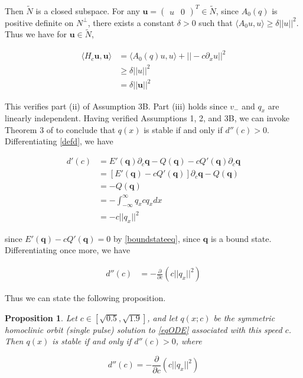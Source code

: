 \documentclass[12pt]{article}
\newtheorem{proposition}{Proposition}
\begin{document}
Then $\tilde{N}$ is a closed subspace. For any $\textbf{u} = \begin{pmatrix}u & 0\end{pmatrix}^T \in \tilde{N}$, since $A_0(q)$ is positive definite on $N^\perp$, there exists a constant $\delta > 0$ such that $\langle A_0 u, u \rangle \geq \delta ||u||^2$. Thus we have for $\textbf{u} \in \tilde{N}$,

\begin{align*}
\langle H_c \textbf{u}, \textbf{u} \rangle 
&= \langle A_0(q) u, u \rangle + || -c \partial_x u||^2 \\
&\geq \delta ||u||^2\\
&= \delta ||\textbf{u}||^2
\end{align*}

This verifies part (ii) of Assumption 3B. Part (iii) holds since $v_-$ and $q_x$ are linearly independent. Having verified Assumptions 1, 2, and 3B, we can invoke Theorem 3 of \cite{Grillakis1987} to conclude that $q(x)$ is stable if and only if $d''(c) > 0$. Differentiating \eqref{defd}, we have

\begin{align*}
d'(c) &= E'(\textbf{q})\partial_c \textbf{q} - Q(\textbf{q}) - c Q'(\textbf{q}) \partial_c \textbf{q} \\
&= [E'(\textbf{q}) - c Q'(\textbf{q})]\partial_c \textbf{q} - Q(\textbf{q}) \\
&= - Q(\textbf{q}) \\
&= -\int_{-\infty}^\infty q_x c q_x dx \\
&= -c ||q_x||^2
\end{align*}

since $E'(\textbf{q}) - c Q'(\textbf{q}) = 0$ by \eqref{boundstateeq}, since $\textbf{q}$ is a bound state. Differentiating once more, we have

\begin{align*}
d''(c) &= -\frac{\partial}{\partial c} \left( c ||q_x||^2 \right)
\end{align*}

Thus we can state the following proposition.

\begin{proposition}\label{stabcrit}
Let $c \in [\sqrt{0.5}, \sqrt{1.9}]$, and let $q(x; c)$ be the symmetric homoclinic orbit (single pulse) solution to \eqref{eqODE} associated with this speed $c$. Then $q(x)$ is stable if and only if $d''(c) > 0$, where

\begin{equation}\label{dcc}
d''(c) = -\frac{\partial}{\partial c} \left( c ||q_x||^2 \right)
\end{equation}
\end{proposition}
\end{document}

